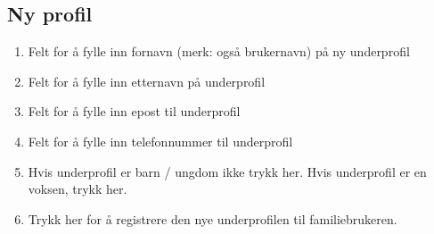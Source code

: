 \subsection{Ny profil}
\begin{center}
\end{center}
\begin{enumerate}[nosep]
    \item Felt for å fylle inn fornavn (merk: også brukernavn) på ny underprofil
    \item Felt for å fylle inn etternavn på underprofil
    \item Felt for å fylle inn epost til underprofil
    \item Felt for å fylle inn telefonnummer til underprofil
    \item Hvis underprofil er barn / ungdom ikke trykk her. Hvis underprofil er en voksen, trykk her.
    \item Trykk her for å registrere den nye underprofilen til familiebrukeren.
\end{enumerate}

